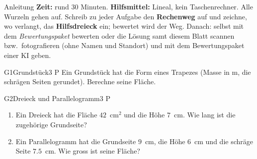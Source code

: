 \documentclass[11pt]{article}
\begin{document}

\begin{lpinfo}{Anleitung}
\textbf{Zeit:} rund 30 Minuten. \textbf{Hilfsmittel:} Lineal, kein Taschenrechner. Alle Wurzeln gehen auf.
Schreib zu jeder Aufgabe den \textbf{Rechenweg} auf und zeichne, wo verlangt, das \textbf{Hilfsdreieck} ein; bewertet wird der Weg.
Danach: selbst mit dem \emph{Bewertungspaket} bewerten oder die Lösung samt diesem Blatt scannen bzw.\ fotografieren
(ohne Namen und Standort) und mit dem Bewertungspaket einer KI geben.
\end{lpinfo}


\begin{lpaufgabe}{G1}{Grundstück}{3 P}
Ein Grundstück hat die Form eines Trapezes (Masse in m, die schrägen Seiten gerundet). Berechne seine Fläche.
\begin{center}
\end{center}
\end{lpaufgabe}

\begin{lpaufgabe}{G2}{Dreieck und Parallelogramm}{3 P}
\begin{enumerate}[label=(\alph*),leftmargin=*,itemsep=3pt]
\item Ein Dreieck hat die Fläche $42$~cm$^2$ und die Höhe $7$~cm. Wie lang ist die zugehörige Grundseite?
\item Ein Parallelogramm hat die Grundseite $9$~cm, die Höhe $6$~cm und die schräge Seite $7.5$~cm. Wie gross ist seine Fläche?
\end{enumerate}
\end{lpaufgabe}

\end{document}
